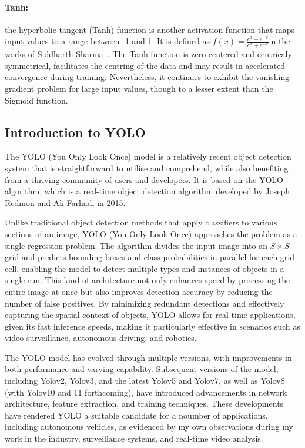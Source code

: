 \paragraph{Tanh:}\label{par:tanh}
the hyperbolic tangent (Tanh) function is another activation function that maps input values to a range between -1 and 1.
It is defined as  \( f(x) = \frac{e^x - e^{-x}}{e^x + e^{-x}} \)in the works of Siddharth Sharma~\cite{sharma2017activation}.
The Tanh function is zero-centered and centricaly symmetrical, facilitates the centring of the data and may result in accelerated convergence during training.
Nevertheless, it continues to exhibit the vanishing gradient problem for large input values, though to a lesser extent than the Sigmoid function.



\subsection{Introduction to YOLO}\label{subsec:introduction-to-yolo}

The YOLO (You Only Look Once) model is a relatively recent object detection system that is straightforward to utilise and comprehend, while also benefiting from a thriving community of users and developers.
It is based on the YOLO algorithm, which is a real-time object detection algorithm developed by Joseph Redmon and Ali Farhadi in 2015\cite{redmon2016lookonceunifiedrealtime}.



Unlike traditional object detection methods that apply classifiers to various sections of an image,
YOLO (You Only Look Once) approaches the problem as a single regression problem.
The algorithm divides the input image into an
\(S \times S\) grid and predicts bounding boxes and class probabilities in parallel for each grid cell,
enabling the model to detect multiple types and instances of objects in a single run.
This kind of architecture not only enhances speed by processing the entire image at once
but also improves detection accuracy by reducing the number of false positives.
By minimizing redundant detections and effectively capturing the spatial context of objects,
YOLO allows for real-time applications, given its fast inference speeds, making it particularly effective in scenarios such as video surveillance, autonomous driving, and robotics.

The YOLO model has evolved through multiple versions, with improvements in both performance and varying capability.
Subsequent versions of the model, including Yolov2, Yolov3, and the latest Yolov5 and Yolov7, as well as Yolov8 (with Yolov10 and 11 forthcoming),
have introduced advancements in network architecture,
feature extraction, and training techniques.
These developments have rendered YOLO a suitable candidate for a noumber of applications,
including autonomous vehicles, as evidenced by my own observations during my work in the industry, surveillance systems, and real-time video analysis.

